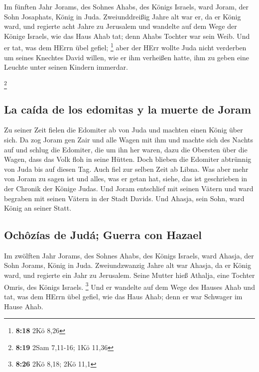  Im fünften Jahr Jorams, des Sohnes Ahabs, des Königs
Israels, ward Joram, der Sohn Josaphats, König in Juda. 
Zweiunddreißig Jahre alt war er, da er König ward, und regierte acht
Jahre zu Jerusalem  und wandelte auf dem Wege der Könige
Israels, wie das Haus Ahab tat; denn Ahabs Tochter war sein Weib. Und er
tat, was dem HErrn übel gefiel; \footnote{\textbf{8:18} 2Kö 8,26}
 aber der HErr wollte Juda nicht verderben um seines
Knechtes David willen, wie er ihm verheißen hatte, ihm zu geben eine
Leuchte unter seinen Kindern immerdar.

\footnote{\textbf{8:19} 2Sam 7,11-16; 1Kö 11,36}

\hypertarget{la-cauxedda-de-los-edomitas-y-la-muerte-de-joram}{%
\subsection{La caída de los edomitas y la muerte de
Joram}\label{la-cauxedda-de-los-edomitas-y-la-muerte-de-joram}}

 Zu seiner Zeit fielen die Edomiter ab von Juda und
machten einen König über sich.  Da zog Joram gen Zair und
alle Wagen mit ihm und machte sich des Nachts auf und schlug die
Edomiter, die um ihn her waren, dazu die Obersten über die Wagen, dass
das Volk floh in seine Hütten.  Doch blieben die Edomiter
abtrünnig von Juda bis auf diesen Tag. Auch fiel zur selben Zeit ab
Libna.  Was aber mehr von Joram zu sagen ist und alles,
was er getan hat, siehe, das ist geschrieben in der Chronik der Könige
Judas.  Und Joram entschlief mit seinen Vätern und ward
begraben mit seinen Vätern in der Stadt Davids. Und Ahasja, sein Sohn,
ward König an seiner Statt.

\hypertarget{ochuxf4zuxedas-de-juduxe1-guerra-con-hazael}{%
\subsection{Ochôzías de Judá; Guerra con
Hazael}\label{ochuxf4zuxedas-de-juduxe1-guerra-con-hazael}}

 Im zwölften Jahr Jorams, des Sohnes Ahabs, des Königs
Israels, ward Ahasja, der Sohn Jorams, König in Juda. 
Zweiundzwanzig Jahre alt war Ahasja, da er König ward, und regierte ein
Jahr zu Jerusalem. Seine Mutter hieß Athalja, eine Tochter Omris, des
Königs Israels. \footnote{\textbf{8:26} 2Kö 8,18; 2Kö 11,1}
 Und er wandelte auf dem Wege des Hauses Ahab und tat,
was dem HErrn übel gefiel, wie das Haus Ahab; denn er war Schwager im
Hause Ahab.

